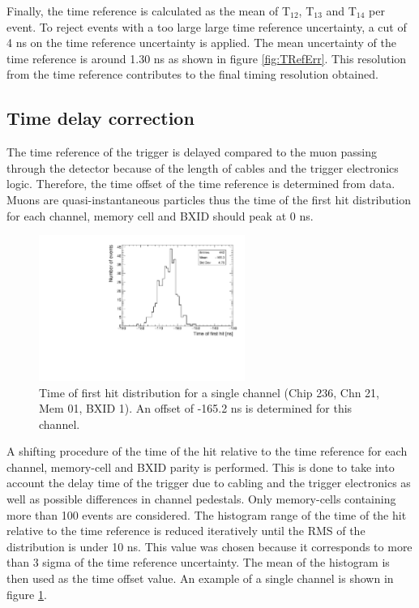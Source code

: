 \documentclass{JINST}
\begin{document}
Finally, the time reference is calculated as the mean of T$_{12}$, T$_{13}$ and T$_{14}$ per event. To reject events with a too large large time reference uncertainty, a cut of 4 ns on the time reference uncertainty is applied. The mean uncertainty of the time reference is around 1.30 ns as shown in figure \ref{fig:TRefErr}. This resolution from the time reference contributes to the final timing resolution obtained.

\subsection{Time delay correction}

The time reference of the trigger is delayed compared to the muon passing through the detector because of the length of cables and the trigger electronics logic. Therefore, the time offset of the time reference is determined from data. Muons are quasi-instantaneous particles thus the time of the first hit distribution for each channel, memory cell and BXID should peak at 0 ns.

\begin{figure}[htbp!]
  \centering
  \includegraphics[width=0.6\textwidth]{fig/Timing_Chip236_Chn21_Mem01_BXID1_withOffset.pdf}
  \caption{Time of first hit distribution for a single channel (Chip 236, Chn 21, Mem 01, BXID 1). An offset of -165.2 ns is determined for this channel.}\label{fig:TimeChnwithOffset}
\end{figure}

A shifting procedure of the time of the hit relative to the time reference for each channel, memory-cell and BXID parity is performed. This is done to take into account the delay time of the trigger due to cabling and the trigger electronics as well as possible differences in channel pedestals. Only memory-cells containing more than 100 events are considered. The histogram range of the time of the hit relative to the time reference is reduced iteratively until the RMS of the distribution is under 10 ns. This value was chosen because it corresponds to more than 3 sigma of the time reference uncertainty. The mean of the histogram is then used as the time offset value. An example of a single channel is shown in figure \ref{fig:TimeChnwithOffset}.
\end{document}
